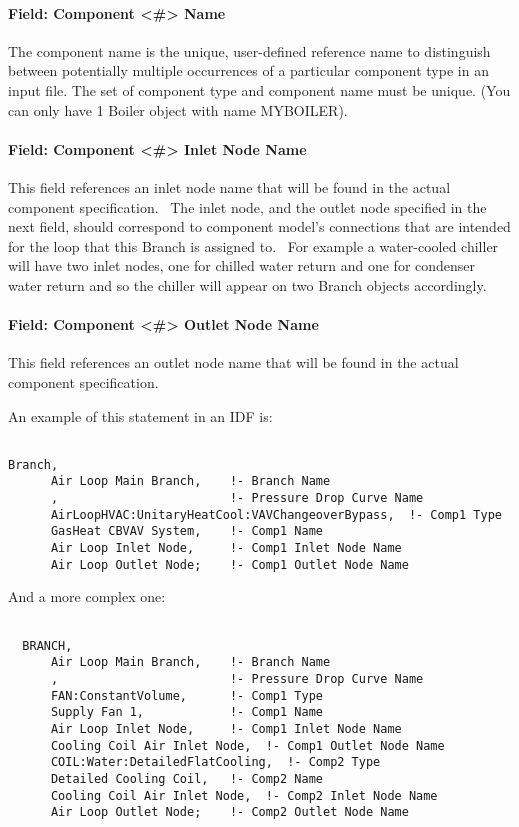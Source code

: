 \paragraph{Field: Component \textless{}\#\textgreater{} Name}\label{field-component-name-001}

The component name is the unique, user-defined reference name to distinguish between potentially multiple occurrences of a particular component type in an input file. The set of component type and component name must be unique. (You can only have 1 Boiler object with name MYBOILER).

\paragraph{Field: Component \textless{}\#\textgreater{} Inlet Node Name}\label{field-component-inlet-node-name}

This field references an inlet node name that will be found in the actual component specification.~ The inlet node, and the outlet node specified in the next field, should correspond to component model's connections that are intended for the loop that this Branch is assigned to.~ For example a water-cooled chiller will have two inlet nodes, one for chilled water return and one for condenser water return and so the chiller will appear on two Branch objects accordingly.

\paragraph{Field: Component \textless{}\#\textgreater{} Outlet Node Name}\label{field-component-outlet-node-name}

This field references an outlet node name that will be found in the actual component specification.

An example of this statement in an IDF is:

\begin{lstlisting}

Branch,
      Air Loop Main Branch,    !- Branch Name
      ,                        !- Pressure Drop Curve Name
      AirLoopHVAC:UnitaryHeatCool:VAVChangeoverBypass,  !- Comp1 Type
      GasHeat CBVAV System,    !- Comp1 Name
      Air Loop Inlet Node,     !- Comp1 Inlet Node Name
      Air Loop Outlet Node;    !- Comp1 Outlet Node Name
\end{lstlisting}

And a more complex one:

\begin{lstlisting}

  BRANCH,
      Air Loop Main Branch,    !- Branch Name
      ,                        !- Pressure Drop Curve Name
      FAN:ConstantVolume,      !- Comp1 Type
      Supply Fan 1,            !- Comp1 Name
      Air Loop Inlet Node,     !- Comp1 Inlet Node Name
      Cooling Coil Air Inlet Node,  !- Comp1 Outlet Node Name
      COIL:Water:DetailedFlatCooling,  !- Comp2 Type
      Detailed Cooling Coil,   !- Comp2 Name
      Cooling Coil Air Inlet Node,  !- Comp2 Inlet Node Name
      Air Loop Outlet Node;    !- Comp2 Outlet Node Name
\end{lstlisting}

